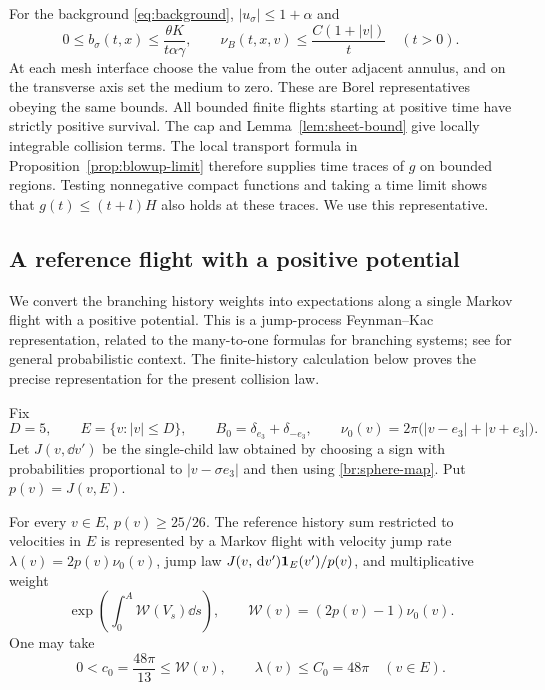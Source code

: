 For the background \eqref{eq:background}, \(|u_\sigma|\le1+\alpha\) and
\begin{equation}\label{br:global-rate}
0\le b_\sigma(t,x)\le\frac{\theta K}{t\alpha\gamma},
\qquad
\nu_B(t,x,v)\le\frac{C(1+|v|)}{t}\quad(t>0).
\end{equation}
At each mesh interface choose the value from the outer adjacent
annulus, and on the transverse axis set the medium to zero.
These are Borel representatives obeying the same bounds.
All bounded finite flights starting at
positive time have strictly positive survival. The cap and
Lemma~\ref{lem:sheet-bound} give locally integrable collision terms.
The local transport formula in Proposition~\ref{prop:blowup-limit}
therefore supplies time traces of \(g\) on bounded regions. Testing
nonnegative compact functions and taking a time limit shows that
\(g(t)\le(t+l)H\) also holds at these traces. We use this representative.

\subsection{A reference flight with a positive potential}

We convert the branching history weights into expectations along a
single Markov flight with a positive potential. This is a jump-process
Feynman--Kac representation, related to the many-to-one formulas for
branching systems; see \cite[Section~4.1]{HarrisRoberts2017} for general
probabilistic context. The finite-history calculation below proves the
precise representation for the present collision law.

Fix
\[
D=5,\qquad E=\{v:|v|\le D\},\qquad
B_0=\delta_{e_3}+\delta_{-e_3},\qquad
\nu_0(v)=2\pi\bigl(|v-e_3|+|v+e_3|\bigr).
\]
Let \(J(v,\dd v')\) be the single-child law obtained by choosing a sign
with probabilities proportional to \(|v-\sigma e_3|\) and then using
\eqref{br:sphere-map}. Put \(p(v)=J(v,E)\).

\begin{lemma}\label{br:retention}
For every \(v\in E\), \(p(v)\ge25/26\).
The reference history sum restricted to velocities in \(E\) is represented
by a Markov flight with velocity jump rate
\(\lambda(v)=2p(v)\nu_0(v)\), jump law
\(J(v,\,\mathrm d v')\mathbf 1_E(v')/p(v)\), and multiplicative weight
\[
\exp\left(\int_0^A \mathcal W(V_s)\dd s\right),
\qquad \mathcal W(v)=(2p(v)-1)\nu_0(v).
\]
One may take
\begin{equation}\label{br:potential-bounds}
0<c_0=\frac{48\pi}{13}\le \mathcal W(v),\qquad
\lambda(v)\le C_0=48\pi\quad(v\in E).
\end{equation}
\end{lemma}

